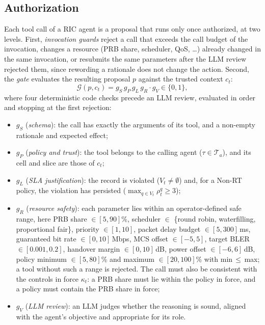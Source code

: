 \documentclass[conference]{IEEEtran}
\newcommand{\G}{\mathcal{G}}
\begin{document}
\subsection{Authorization}\label{sec:auth}
Each tool call of a RIC agent is a proposal that runs only once authorized, at two levels. First, \emph{invocation guards} reject a call that exceeds the call budget of the invocation, changes a resource (PRB share, scheduler, QoS, \dots) already changed in the same invocation, or resubmits the same parameters after the LLM review rejected them, since rewording a rationale does not change the action. Second, the \emph{gate} evaluates the resulting proposal $p$ against the trusted context $c_t$:
\begin{equation}
\G(p,c_t)=g_S\,g_P\,g_L\,g_R\cdot g_V \in\{0,1\},
\end{equation}
where four deterministic code checks precede an LLM review, evaluated in order and stopping at the first rejection:
\begin{itemize}
\item $g_S$ (\emph{schema}): the call has exactly the arguments of its tool, and a non-empty rationale and expected effect;
\item $g_P$ (\emph{policy and trust}): the tool belongs to the calling agent ($\tau\in\mathcal{T}_a$), and its cell and slice are those of $c_t$;
\item $g_L$ (\emph{SLA justification}): the record is violated ($V_t\neq\emptyset$) and, for a Non-RT policy, the violation has persisted ($\max_{q\in V_t}\rho_t^q\ge3$);
\item $g_R$ (\emph{resource safety}): each parameter lies within an operator-defined safe range, here PRB share $\in[5,90]$\%, scheduler $\in$ \{round robin, waterfilling, proportional fair\}, priority $\in[1,10]$, packet delay budget $\in[5,300]$\,ms, guaranteed bit rate $\in[0,10]$\,Mbps, MCS offset $\in[-5,5]$, target BLER $\in[0.001,0.2]$, handover margin $\in[0,10]$\,dB, power offset $\in[-6,6]$\,dB, policy minimum $\in[5,80]$\% and maximum $\in[20,100]$\% with min$\,\le\,$max; a tool without such a range is rejected. The call must also be consistent with the controls in force $\kappa_t$: a PRB share must lie within the policy in force, and a policy must contain the PRB share in force;
\item $g_V$ (\emph{LLM review}): an LLM judges whether the reasoning is sound, aligned with the agent's objective and appropriate for its role.
\end{itemize}
\end{document}
